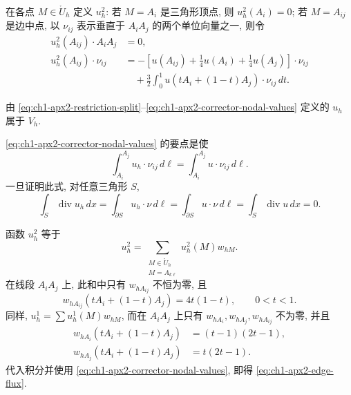 在各点 $M\in\mathring U_h$ 定义 $u_h^2$: 若 $M=A_i$ 是三角形顶点, 则 $u_h^2(A_i)=0$; 若 $M=A_{ij}$ 是边中点, 以 $\nu_{ij}$ 表示垂直于 $A_iA_j$ 的两个单位向量之一, 则令
\begin{equation}
\begin{aligned}
u_h^2(A_{ij})\cdot A_iA_j&=0,\\
u_h^2(A_{ij})\cdot\nu_{ij}
&=-\left[u(A_{ij})+\frac14u(A_i)+\frac14u(A_j)\right]\cdot\nu_{ij}\\
&\quad+\frac32\int_0^1u(tA_i+(1-t)A_j)\cdot\nu_{ij}\,dt.
\end{aligned}
\label{eq:ch1-apx2-corrector-nodal-values}
\end{equation}

\begin{Lemma}
\label{lem:ch1-apx2-restriction-in-vh}
由 \eqref{eq:ch1-apx2-restriction-split}--\eqref{eq:ch1-apx2-corrector-nodal-values} 定义的 $u_h$ 属于 $V_h$.
\end{Lemma}

\begin{Proof}
\eqref{eq:ch1-apx2-corrector-nodal-values} 的要点是使
\begin{equation}
\int_{A_i}^{A_j}u_h\cdot\nu_{ij}\,d\ell
=\int_{A_i}^{A_j}u\cdot\nu_{ij}\,d\ell.
\label{eq:ch1-apx2-edge-flux}
\end{equation}
一旦证明此式, 对任意三角形 $S$,
\[
\int_S\operatorname{div}u_h\,dx
=\int_{\partial S}u_h\cdot\nu\,d\ell
=\int_{\partial S}u\cdot\nu\,d\ell
=\int_S\operatorname{div}u\,dx=0.
\]

函数 $u_h^2$ 等于
\begin{equation}
u_h^2=\sum_{\substack{M\in\mathring U_h\\M=A_{k\ell}}}
u_h^2(M)w_{hM}.
\label{eq:ch1-apx2-corrector-expansion}
\end{equation}
在线段 $A_iA_j$ 上, 此和中只有 $w_{hA_{ij}}$ 不恒为零, 且
\begin{equation}
w_{hA_{ij}}(tA_i+(1-t)A_j)=4t(1-t),
\qquad0<t<1.
\label{eq:ch1-midpoint-basis-edge}
\end{equation}
同样, $u_h^1=\sum u_h^1(M)w_{hM}$, 而在 $A_iA_j$ 上只有 $w_{hA_i},w_{hA_j},w_{hA_{ij}}$ 不为零, 并且
\begin{equation}
\begin{aligned}
w_{hA_i}(tA_i+(1-t)A_j)&=(t-1)(2t-1),\\
w_{hA_j}(tA_i+(1-t)A_j)&=t(2t-1).
\end{aligned}
\label{eq:ch1-vertex-basis-edge}
\end{equation}
代入积分并使用 \eqref{eq:ch1-apx2-corrector-nodal-values}, 即得 \eqref{eq:ch1-apx2-edge-flux}.
\end{Proof}

